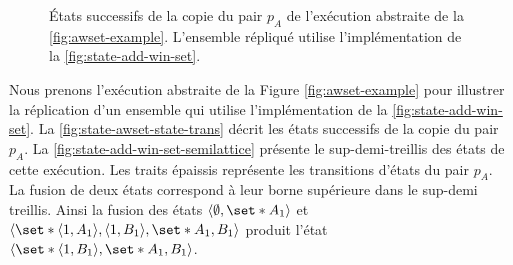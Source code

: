 \begin{figure}[tbh]
\centering
{}
\caption{États successifs de la copie du pair $p_A$ de l'exécution abstraite de la \autoref{fig:awset-example}.
L'ensemble répliqué utilise l'implémentation de la \autoref{fig:state-add-win-set}.}\label{fig:state-awset-state-trans}
\end{figure}

Nous prenons l’exécution abstraite de la Figure \autoref{fig:awset-example} pour illustrer la réplication d’un ensemble qui utilise l’implémentation de la \autoref{fig:state-add-win-set}.
La \autoref{fig:state-awset-state-trans} décrit les états successifs de la copie du pair $p_A$.
La \autoref{fig:state-add-win-set-semilattice} présente le sup-demi-treillis des états de cette exécution.
Les traits épaissis représente les transitions d'états du pair $p_A$.
La fusion de deux états correspond à leur borne supérieure dans le sup-demi treillis.
Ainsi la fusion des états $\tuple*{\emptyset,\set*{A_1}}$ et $\tuple*{\set*{\tuple*{1,A_1},\tuple*{1,B_1}},\set*{A_1,B_1}}$ produit l'état $\tuple*{\set*{\tuple*{1,B_1}},\set*{A_1,B_1}}$.

